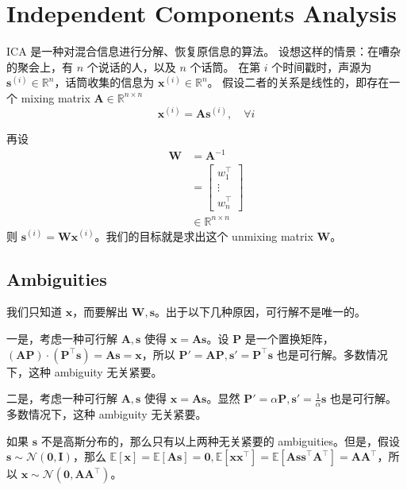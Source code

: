 \chapter{Independent Components Analysis}
	ICA 是一种对混合信息进行分解、恢复原信息的算法。
	设想这样的情景：在嘈杂的聚会上，有 $ n $ 个说话的人，以及 $ n $ 个话筒。
	在第 $ i $ 个时间戳时，声源为 $ \bm{s}^{(i)} \in \mathbb{R}^n $，话筒收集的信息为 $ \bm{x}^{(i)} \in \mathbb{R}^n $。
	假设二者的关系是线性的，即存在一个 mixing matrix $ \bm{A} \in \mathbb{R}^{n \times n} $
	\begin{equation}
		\bm{x}^{(i)} = \bm{A} \bm{s}^{(i)} , \quad \forall i
	\end{equation}
	
	再设
	\begin{align*}
		\bm{W} &= \bm{A}^{-1} \\
		&= 
		\begin{bmatrix}
			w_1^\intercal \\
			\vdots \\
			w_n^\intercal
		\end{bmatrix} \\
		&\in \mathbb{R}^{n \times n}
	\end{align*}
	则 $ \bm{s}^{(i)} = \bm{W} \bm{x}^{(i)} $。我们的目标就是求出这个 unmixing matrix $ \bm{W} $。
	
	\section{Ambiguities}
		我们只知道 $ \bm{x} $，而要解出 $ \bm{W}, \bm{s} $。出于以下几种原因，可行解不是唯一的。
		
		一是，考虑一种可行解 $ \bm{A}, \bm{s} $ 使得 $ \bm{x} = \bm{As} $。设 $ \bm{P} $ 是一个置换矩阵，$ (\bm{AP}) \cdot (\bm{P}^\intercal \bm{s}) = \bm{As} = \bm{x} $，所以 $ \bm{P}' = \bm{AP}, \bm{s}' = \bm{P}^\intercal \bm{s} $ 也是可行解。多数情况下，这种 ambiguity 无关紧要。
		
		二是，考虑一种可行解 $ \bm{A}, \bm{s} $ 使得 $ \bm{x} = \bm{As} $。显然 $ \bm{P}' = \alpha \bm{P}, \bm{s}' = \frac{1}{\alpha} \bm{s} $ 也是可行解。多数情况下，这种 ambiguity 无关紧要。
		
		如果 $ \bm{s} $ 不是高斯分布的，那么只有以上两种无关紧要的 ambiguities。但是，假设 $ \bm{s} \sim \mathcal{N}(\bm{0}, \bm{I}) $，那么
		$ \mathbb{E}[\bm{x}] = \mathbb{E}[\bm{As}] = \bm{0}, \mathbb{E}[\bm{xx}^\intercal] = \mathbb{E}[\bm{Ass}^\intercal\bm{A}^\intercal] = \bm{AA}^\intercal $，所以 $ \bm{x} \sim \mathcal{N}(\bm{0}, \bm{AA}^\intercal) $。